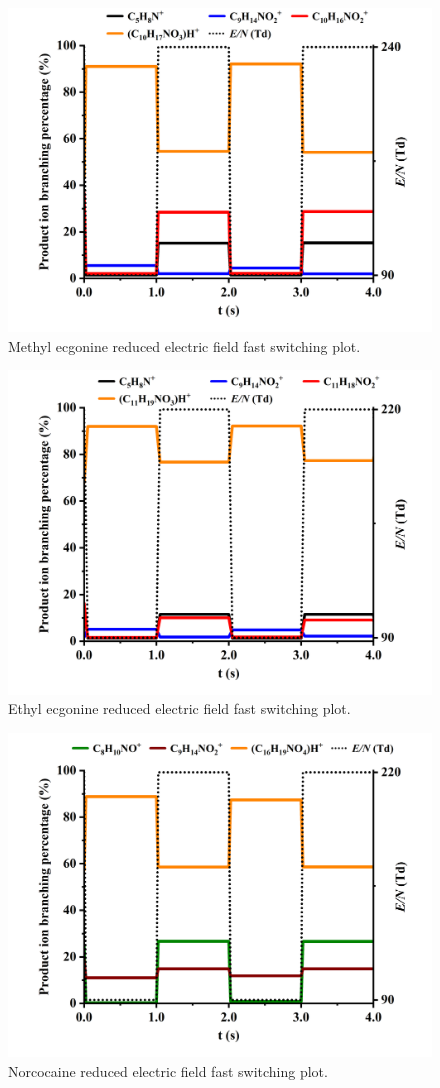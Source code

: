 \begin{figure}[htb]
\centering
\includegraphics[width=0.80\linewidth]{pics/other_drugs/MeEcg-fs-90-240.png}
\caption{Methyl ecgonine reduced electric field fast switching plot.}
\label{fig:DR_MeEcg_fs}
\end{figure}


\begin{figure}[htb]
\centering
\includegraphics[width=0.80\linewidth]{pics/other_drugs/EtEcg-fs-90-220.png}
\caption{Ethyl ecgonine reduced electric field fast switching plot.}
\label{fig:DR_EtEcg_fs}
\end{figure}


\begin{figure}[htb]
\centering
\includegraphics[width=0.80\linewidth]{pics/other_drugs/norcocaine-fs-90-220.png}
\caption{Norcocaine reduced electric field fast switching plot.}
\label{fig:DR_norcocaine_fs}
\end{figure}


